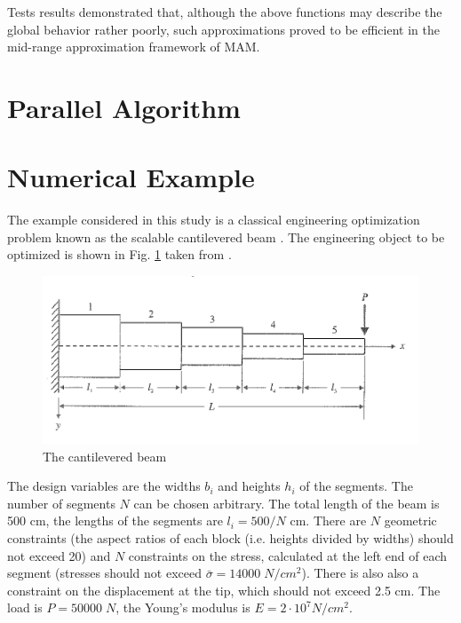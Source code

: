 \documentclass[runningheads,a4paper]{llncs}
\begin{document}
Tests results demonstrated that, although the above functions may describe the global behavior rather poorly, such approximations proved to be efficient in the mid-range approximation framework of MAM.

\section{Parallel Algorithm}
\label{sec:par_alg}

\section{Numerical Example}
\label{sec:num_example}

The example considered in this study is a classical engineering optimization problem known as the scalable cantilevered beam \cite{Vanderpllaats2001}. The engineering object to be optimized is shown in Fig. \ref{fig:beam} taken from \cite{Vanderpllaats2001}.

\begin{figure}[ht]
    \centering
    \includegraphics[width=1.0\textwidth]{beam.png}
    \caption{The cantilevered beam}
    \label{fig:beam}
\end{figure}

The design variables are the widths $b_i$ and heights $h_i$ of the segments. The number of segments $N$ can be chosen arbitrary. The total length of the beam is 500 cm, the lengths of the segments are $l_i=500/N$  cm. There are $N$ geometric constraints (the aspect ratios of each block (i.e. heights divided by widths) should not exceed 20) and $N$ constraints on the stress, calculated at the left end of each segment (stresses should not exceed  $\bar{\sigma}=14000\; N/cm^2$). There is also also a constraint on the displacement at the tip, which should not exceed 2.5 cm. The load is $P = 50 000\; N$, the Young's modulus is $E=2\cdot 10^7  N/cm^2$.
\end{document}
